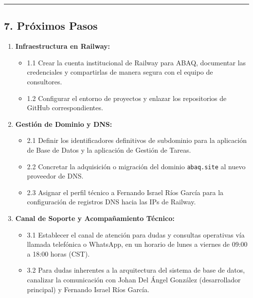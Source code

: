 \documentclass[
]{article}
\providecommand{\tightlist}{%
  \setlength{\itemsep}{0pt}\setlength{\parskip}{0pt}}
\begin{document}
\begin{center}\rule{0.5\linewidth}{0.5pt}\end{center}

\subsection{7. Próximos Pasos}\label{pruxf3ximos-pasos}

\begin{enumerate}
\def\labelenumi{\arabic{enumi}.}
\tightlist
\item
  \textbf{Infraestructura en Railway:}

  \begin{itemize}
  \tightlist
  \item
    1.1 Crear la cuenta institucional de Railway para ABAQ, documentar
    las credenciales y compartirlas de manera segura con el equipo de
    consultores.
  \item
    1.2 Configurar el entorno de proyectos y enlazar los repositorios de
    GitHub correspondientes.
  \end{itemize}
\item
  \textbf{Gestión de Dominio y DNS:}

  \begin{itemize}
  \tightlist
  \item
    2.1 Definir los identificadores definitivos de subdominio para la
    aplicación de Base de Datos y la aplicación de Gestión de Tareas.
  \item
    2.2 Concretar la adquisición o migración del dominio
    \texttt{abaq.site} al nuevo proveedor de DNS.
  \item
    2.3 Asignar el perfil técnico a Fernando Israel Ríos García para la
    configuración de registros DNS hacia las IPs de Railway.
  \end{itemize}
\item
  \textbf{Canal de Soporte y Acompañamiento Técnico:}

  \begin{itemize}
  \tightlist
  \item
    3.1 Establecer el canal de atención para dudas y consultas
    operativas vía llamada telefónica o WhatsApp, en un horario de lunes
    a viernes de 09:00 a 18:00 horas (CST).
  \item
    3.2 Para dudas inherentes a la arquitectura del sistema de base de
    datos, canalizar la comunicación con Johan Del Ángel González
    (desarrollador principal) y Fernando Israel Ríos García.
  \end{itemize}
\end{enumerate}
\end{document}
